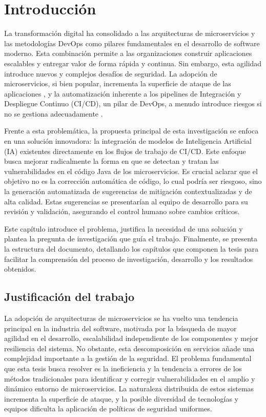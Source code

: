 \chapter{Introducción}\label{chap:introduccion}
La transformación digital ha consolidado a las arquitecturas de microservicios y las metodologías DevOps como pilares fundamentales en el desarrollo de software moderno. Esta combinación permite a las organizaciones construir aplicaciones escalables y entregar valor de forma rápida y continua. Sin embargo, esta agilidad introduce nuevos y complejos desafíos de seguridad. La adopción de microservicios, si bien popular, incrementa la superficie de ataque de las aplicaciones \cite{Zafeiropoulos2023SecurityGaps}, y la automatización inherente a los pipelines de Integración y Despliegue Continuo (CI/CD), un pilar de DevOps, a menudo introduce riesgos si no se gestiona adecuadamente \cite{NIST2024CICDSecurity}.

Frente a esta problemática, la propuesta principal de esta investigación se enfoca en una solución innovadora: la integración de modelos de Inteligencia Artificial (IA) existentes directamente en los flujos de trabajo de CI/CD. Este enfoque busca mejorar radicalmente la forma en que se detectan y tratan las vulnerabilidades en el código Java de los microservicios. Es crucial aclarar que el objetivo no es la corrección automática de código, lo cual podría ser riesgoso, sino la generación automatizada de sugerencias de mitigación contextualizadas y de alta calidad. Estas sugerencias se presentarían al equipo de desarrollo para su revisión y validación, asegurando el control humano sobre cambios críticos.

Este capítulo introduce el problema, justifica la necesidad de una solución y plantea la pregunta de investigación que guía el trabajo. Finalmente, se presenta la estructura del documento, detallando los capítulos que componen la tesis para facilitar la comprensión del proceso de investigación, desarrollo y los resultados obtenidos.

\section{Justificación del trabajo}\label{sec:justificaciontrabajo}
La adopción de arquitecturas de microservicios se ha vuelto una tendencia principal en la industria del software, motivada por la búsqueda de mayor agilidad en el desarrollo, escalabilidad independiente de los componentes y mejor resiliencia del sistema. No obstante, esta descomposición en servicios añade una complejidad importante a la gestión de la seguridad. El problema fundamental que esta tesis busca resolver es la ineficiencia y la tendencia a errores de los métodos tradicionales para identificar y corregir vulnerabilidades en el amplio y dinámico entorno de microservicios. La naturaleza distribuida de estos sistemas incrementa la superficie de ataque, y la posible diversidad de tecnologías y equipos dificulta la aplicación de políticas de seguridad uniformes.

